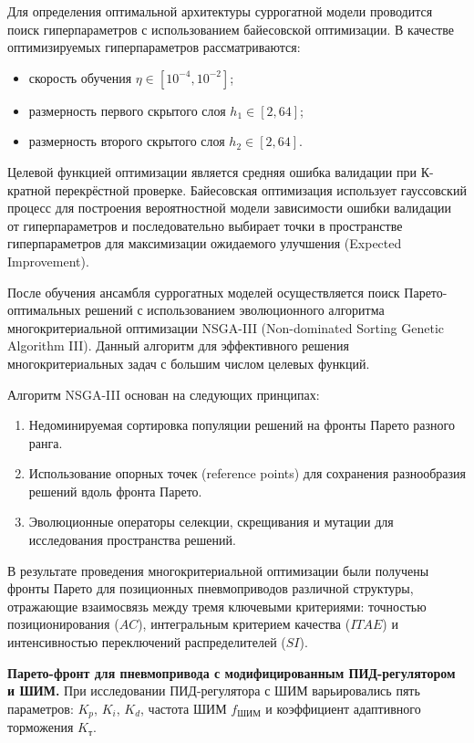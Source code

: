 Для определения оптимальной архитектуры суррогатной модели проводится поиск гиперпараметров
с использованием байесовской оптимизации. В качестве оптимизируемых гиперпараметров рассматриваются:

\begin{itemize}
	\item скорость обучения $\eta \in [10^{-4}, 10^{-2}]$;
	\item размерность первого скрытого слоя $h_1 \in [2, 64]$;
	\item размерность второго скрытого слоя $h_2 \in [2, 64]$.
\end{itemize}

Целевой функцией оптимизации является средняя ошибка валидации при К-кратной перекрёстной
проверке. Байесовская оптимизация использует гауссовский процесс для построения вероятностной
модели зависимости ошибки валидации от гиперпараметров и последовательно выбирает точки в
пространстве гиперпараметров для максимизации ожидаемого улучшения (Expected Improvement).

После обучения ансамбля суррогатных моделей осуществляется поиск
Парето-оптимальных решений с использованием эволюционного алгоритма
многокритериальной оптимизации NSGA-III (Non-dominated Sorting Genetic Algorithm III).
Данный алгоритм для эффективного решения многокритериальных задач с большим числом
целевых функций.

Алгоритм NSGA-III основан на следующих принципах:
\begin{enumerate}
	\item Недоминируемая сортировка популяции решений на фронты Парето разного ранга.
	\item Использование опорных точек (reference points) для сохранения разнообразия решений вдоль фронта Парето.
	\item Эволюционные операторы селекции, скрещивания и мутации для исследования пространства решений.
\end{enumerate}

В результате проведения многокритериальной оптимизации были получены фронты Парето для
позиционных пневмоприводов различной структуры, отражающие взаимосвязь между тремя
ключевыми критериями: точностью позиционирования ($AC$), интегральным критерием качества
($ITAE$) и интенсивностью переключений распределителей ($SI$).

\textbf{Парето-фронт для пневмопривода с модифицированным ПИД-регулятором и ШИМ.}
При исследовании ПИД-регулятора с ШИМ варьировались пять параметров: $K_p$, $K_i$, $K_d$,
частота ШИМ $f_{\text{ШИМ}}$ и коэффициент адаптивного торможения $K_{\text{т}}$.

